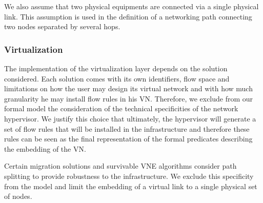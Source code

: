 We also assume that two physical equipments are connected via a single physical link. This assumption is used in the definition of a networking path connecting two nodes separated by several hops.

\subsubsection{Virtualization}
The implementation of the virtualization layer depends on the solution considered.
Each solution comes with its own identifiers, flow space and limitations on how the user may design its virtual network and with how much granularity he may install flow rules in his VN. Therefore, we exclude from our formal model the consideration of the technical specificities of the network hypervisor.
We justify this choice that ultimately, the hypervisor will generate a set of flow rules that will be installed in the infrastructure and therefore these rules can be seen as the final representation of the formal predicates describing the embedding of the VN.

Certain migration solutions and survivable VNE algorithms consider path splitting to provide robustness to the infrastructure.
We exclude this specificity from the model and limit the embedding of a virtual link to a single physical set of nodes.
